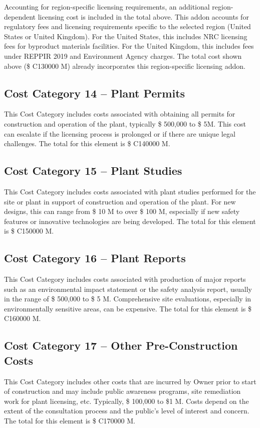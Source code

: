 \ifsafetycosts
Accounting for region-specific licensing requirements, an additional region-dependent licensing cost is included in the total above. This addon accounts for regulatory fees and licensing requirements specific to the selected region (United States or United Kingdom). For the United States, this includes NRC licensing fees for byproduct materials facilities. For the United Kingdom, this includes fees under REPPIR 2019 and Environment Agency charges. The total cost shown above (\$ C130000 M) already incorporates this region-specific licensing addon.
\fi

\subsection*{Cost Category 14 – Plant Permits}
This Cost Category includes costs associated with obtaining all permits for construction and operation of the plant, typically \$ 500,000 to \$ 5M. This cost can escalate if the licensing process is prolonged or if there are unique legal challenges.  The total for this element is \$ C140000 M.

\subsection*{Cost Category 15 – Plant Studies}
This Cost Category includes costs associated with plant studies performed for the site or plant in support of construction and operation of the plant. For new designs, this can range from \$ 10 M to over \$ 100 M, especially if new safety features or innovative technologies are being developed.  The total for this element is \$ C150000 M.

\subsection*{Cost Category 16 – Plant Reports}
This Cost Category includes costs associated with production of major reports such as an environmental impact statement or the safety analysis report, usually in the range of \$ 500,000 to \$ 5 M. Comprehensive site evaluations, especially in environmentally sensitive areas, can be expensive. The total for this element is \$ C160000 M.

\subsection*{Cost Category 17 – Other Pre-Construction Costs}
This Cost Category includes other costs that are incurred by Owner prior to start of construction and may include public awareness programs, site remediation work for plant licensing, etc. Typically, \$ 100,000 to \$1 M. Costs depend on the extent of the consultation process and the public's level of interest and concern.  The total for this element is \$ C170000 M.

